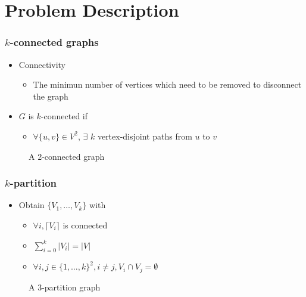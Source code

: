 \documentclass[xcolor=dvipsnames]{beamer}
\begin{document}
\section{Problem Description}

\begin{frame}
  \frametitle{$k$-connected graphs}
  \begin{itemize}
	\item Connectivity
	\begin{itemize}
	\item The minimun number of vertices which need to be removed to disconnect the graph 
	\end{itemize}
    \item $G$ is $k$-connected if 
      \begin{itemize}
      \item $\forall \{u,v\} \in V^2$, $\exists$ $k$ vertex-disjoint paths from $u$ to $v$
      \end{itemize}
  \end{itemize}
  \begin{figure}
    \begin{center}
    
    \end{center}
    \caption{A 2-connected graph}
  \end{figure}
\end{frame}

\begin{frame}
  \frametitle{$k$-partition}
  \begin{itemize}
  \item Obtain $\{V_1, \dots, V_k\}$ with
    \begin{itemize}
    \item $\forall i, \lceil V_i \rceil$ is connected
    \item $\sum\limits_{i=0}^k|V_i| = |V|$
    \item $\forall i,j \in \{1, \dots, k\}^2, i \neq j, V_i \cap V_j = \emptyset$
    \end{itemize}
  \end{itemize}
  \begin{figure}
    \begin{center}
      
    \end{center}
    \caption{A 3-partition graph}
  \end{figure}
\end{frame}
\end{document}
